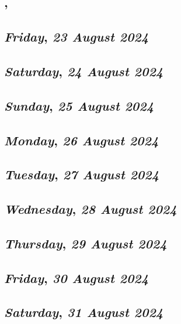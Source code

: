\subsection*{\weekday, \day}

\def\day{\textit{23 August 2024}}
\def\weekday{\textit{Friday}}
\subsection*{\weekday, \day}

\def\day{\textit{24 August 2024}}
\def\weekday{\textit{Saturday}}
\subsection*{\weekday, \day}

\def\day{\textit{25 August 2024}}
\def\weekday{\textit{Sunday}}
\subsection*{\weekday, \day}

\def\day{\textit{26 August 2024}}
\def\weekday{\textit{Monday}}
\subsection*{\weekday, \day}

\def\day{\textit{27 August 2024}}
\def\weekday{\textit{Tuesday}}
\subsection*{\weekday, \day}

\def\day{\textit{28 August 2024}}
\def\weekday{\textit{Wednesday}}
\subsection*{\weekday, \day}

\def\day{\textit{29 August 2024}}
\def\weekday{\textit{Thursday}}
\subsection*{\weekday, \day}

\def\day{\textit{30 August 2024}}
\def\weekday{\textit{Friday}}
\subsection*{\weekday, \day}

\def\day{\textit{31 August 2024}}
\def\weekday{\textit{Saturday}}
\subsection*{\weekday, \day}
